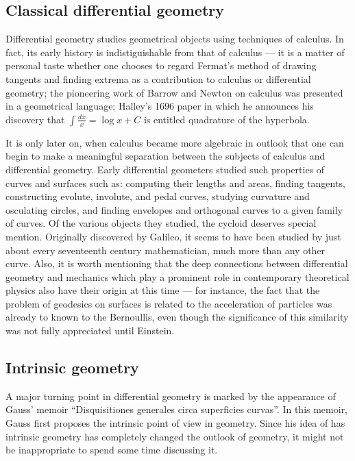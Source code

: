 \documentclass[12pt]{article}
\begin{document}
\subsection{Classical differential geometry}

Differential geometry studies geometrical objects using techniques of
calculus.  In fact, its early history is indistiguishable from that of
calculus --- it is a matter of personal taste whether one chooses to
regard Fermat's method of drawing tangents and finding extrema as a
contribution to calculus or differential geometry; the pioneering work
of Barrow and Newton on calculus was presented in a geometrical
language; Halley's 1696 paper in which he announces his discovery that
$\displaystyle \int \frac{dx}{x} = \log x + C$ is entitled quadrature of the hyperbola.

It is only later on, when calculus became more algebraic in outlook
that one can begin to make a meaningful separation between the
subjects of calculus and differential geometry.  Early differential
geometers studied such properties of curves and surfaces such as:
computing their lengths and areas, finding tangents, constructing
evolute, involute, and pedal curves, studying curvature and osculating
circles, and finding envelopes and orthogonal curves to a given family
of curves.  Of the various objects they studied, the cycloid deserves
special mention.  Originally discovered by Galileo, it seems to have
been studied by just about every seventeenth century mathematician,
much more than any other curve.  Also, it is worth mentioning that the
deep connections between differential geometry and mechanics which
play a prominent role in contemporary theoretical physics also have
their origin at this time --- for instance, the fact that the problem
of geodesics on surfaces is related to the acceleration of particles
was already to known to the Bernoullis, even though the significance
of this similarity was not fully appreciated until Einstein.

\subsection{Intrinsic geometry}

A major turning point in differential geometry is marked by the
appearance of Gauss' memoir ``Disquisitiones generales circa
superficies curvas''.  In this memoir, Gauss first proposes the
intrinsic point of view in geometry.  Since his idea of has intrinsic
geometry has completely changed the outlook of geometry, it might not
be inappropriate to spend some time discussing it.
\end{document}

